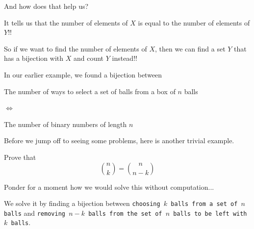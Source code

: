 \documentclass[compress]{beamer}
\begin{document}
\begin{frame}
    And how does that help us?\pause

    \vspace{1em}

    \begin{center}
        \begin{minipage}{.8\linewidth}
            It tells us that the number of elements of $X$ is equal to the number of
            elements of $Y$!!
        \end{minipage}
    \end{center}

    \pause\vspace{1em}

    So if we want to find the number of elements of $X$, then we can
    find a set $Y$ that has a bijection with $X$ and count $Y$ instead!!

    \pause\vspace{1em}

    In our earlier example, we found a bijection between 
    \vspace{1em}

    \begin{center}
        \begin{minipage}{.45\linewidth}
            The number of ways to select a set of balls from a box of $n$ balls
        \end{minipage}\hfill\hspace{.01\linewidth}
        \begin{minipage}{.04\linewidth}
            $\Leftrightarrow$
        \end{minipage}\hfill%
        \begin{minipage}{.45\linewidth}
            The number of binary numbers of length $n$ 
        \end{minipage}
    \end{center}

\end{frame}

\begin{frame}
    Before we jump off to seeing some problems, here is another trivial
    example. \pause
    \vspace{1em}

    Prove that \[{n \choose k} = {n \choose n-k}\] 

    \pause\vspace{1em}

    Ponder for a moment how we would solve this without computation...

    \pause\vspace{1em}

    We solve it by finding a bijection between \texttt{choosing $k$ balls from
    a set of $n$ balls} and \texttt{removing $n-k$ balls from the set of $n$
    balls to be left with $k$ balls}.
\end{frame}
\end{document}
